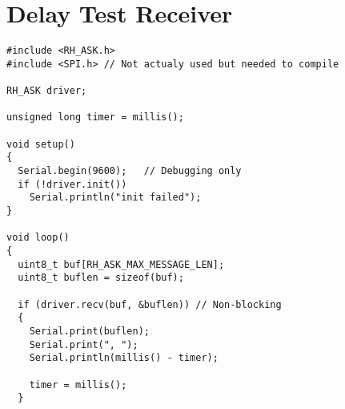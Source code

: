 \chapter{Delay Test Receiver}\label{app:t2receiver}

\begin{lstlisting}[style=customc]
#include <RH_ASK.h>
#include <SPI.h> // Not actualy used but needed to compile

RH_ASK driver;

unsigned long timer = millis();

void setup()
{
  Serial.begin(9600);	// Debugging only
  if (!driver.init())
    Serial.println("init failed");
}

void loop()
{
  uint8_t buf[RH_ASK_MAX_MESSAGE_LEN];
  uint8_t buflen = sizeof(buf);

  if (driver.recv(buf, &buflen)) // Non-blocking
  {
    Serial.print(buflen);
    Serial.print(", ");
    Serial.println(millis() - timer);
  
    timer = millis();
  }

\end{lstlisting}